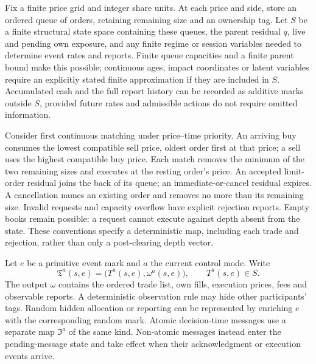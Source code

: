 \documentclass[11pt]{article}
\numberwithin{equation}{section}
\theoremstyle{definition}
\theoremstyle{remark}
\theoremstyle{definition}
\begin{document}
Fix a finite price grid and integer share units. At each price and side,
store an ordered queue of orders, retaining remaining size and an ownership
tag. Let $S$ be a finite structural state space containing these queues, the
parent residual $q$, live and pending own exposure, and any finite regime or
session variables needed to determine event rates and reports. Finite queue
capacities and a finite parent bound make this possible; continuous ages,
impact coordinates or latent variables require an explicitly stated finite
approximation if they are included in $S$. Accumulated cash and the full
report history can be recorded as additive marks outside $S$, provided future
rates and admissible actions do not require omitted information.

Consider first continuous matching under price--time priority. An arriving
buy consumes the lowest compatible sell price, oldest order first at that
price; a sell uses the highest compatible buy price. Each match removes the
minimum of the two remaining sizes and executes at the resting order's price.
An accepted limit-order residual joins the back of its queue; an
immediate-or-cancel residual expires. A cancellation names an existing order
and removes no more than its remaining size. Invalid requests and capacity
overflow have explicit rejection reports. Empty books remain possible: a
request cannot execute against depth absent from the state. These conventions
specify a deterministic map, including each trade and rejection, rather than
only a post-clearing depth vector.

Let $e$ be a primitive event mark and $a$ the current control mode. Write
\begin{equation}\label{eq:taggedclear}
 \mathfrak T^a(s,e)=\bigl(T^a(s,e),\omega^a(s,e)\bigr),
 \qquad T^a(s,e)\in S.
\end{equation}
The output $\omega$ contains the ordered trade list, own fills, execution
prices, fees and observable reports. A deterministic observation rule may
hide other participants' tags. Random hidden allocation or reporting can be
represented by enriching $e$ with the corresponding random mark. Atomic
decision-time messages use a separate map $\mathfrak I^a$ of the same kind.
Non-atomic messages instead enter the pending-message state and take effect
when their acknowledgment or execution events arrive.
\end{document}
